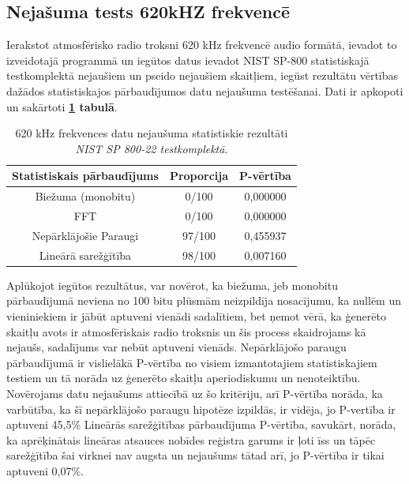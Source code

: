 \documentclass[12pt]{article}
\begin{document}
    \subsection{Nejašuma tests 620kHZ frekvencē}

    Ierakstot atmosfērisko radio troksni 620 kHz frekvencē audio formātā, ievadot to izveidotajā programmā un iegūtos datus ievadot NIST SP-800 statistiskajā testkomplektā nejaušiem un pseido nejaušiem skaitļiem, iegūst rezultātu vērtības dažādos statistiskajos pārbaudījumos datu nejaušuma testēšanai. Dati ir apkopoti un sakārtoti \textbf{\ref{rezultati_620} tabulā}.

\begin{table}[!ht]
\centering


\begin{tabular}{ |c|c|c| }%
\hline
Statistiskais pārbaudījums & Proporcija & P-vērtība \\
\hline
Biežuma (monobitu) & 0/100 & 0,000000\\
\hline
FFT & 0/100 & 0,000000\\
\hline
Nepārklājošie Paraugi & 97/100 & 0,455937 \\ %
\hline
Lineārā sarežģītība & 98/100 & 0,007160 \\
\hline
\end{tabular}

\caption{620 kHz frekvences datu nejaušuma statistiskie rezultāti \\ \emph{NIST SP 800-22 testkomplektā}.\parencite{NIST_orig}}

\label{rezultati_620}
\end{table}
\FloatBarrier
    Aplūkojot iegūtos rezultātus, var novērot, ka  biežuma, jeb monobitu pārbaudījumā neviena no 100 bitu plūsmām neizpildīja nosacījumu, ka nullēm un vieniniekiem ir jābūt aptuveni vienādi sadalītiem, bet ņemot vērā, ka ģenerēto skaitļu avots ir atmosfēriskais radio troksnis un šis process skaidrojams kā nejaušs, sadalījums var nebūt aptuveni vienāds. Nepārklājošo paraugu pārbaudījumā ir vislielākā P-vērtība no visiem izmantotajiem statistiskajiem testiem un tā norāda uz ģenerēto skaitļu aperiodiskumu un nenoteiktību. Novērojams datu nejaušums attiecībā uz šo kritēriju, arī P-vērtība norāda, ka varbūtība, ka šī nepārklājošo paraugu hipotēze izpildās, ir vidēja, jo P-vertība ir aptuveni 45,5\% 
    Lineārās sarežģītības pārbaudījuma P-vērtība, savukārt, norāda, ka aprēķinātais lineāras atsauces nobīdes reģistra garums ir ļoti īss un tāpēc sarežģītība šai virknei nav augsta un nejaušums tātad arī, jo P-vērtība ir tikai aptuveni 0,07\%.
\end{document}

